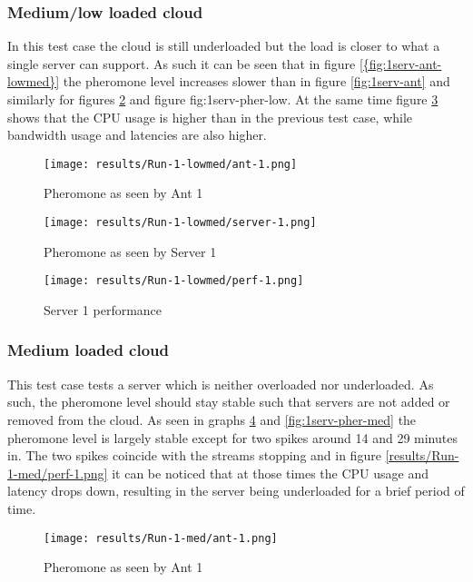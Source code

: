 \subsubsection{Medium/low loaded cloud}

In this test case the cloud is still underloaded but the load is closer to what a single server can support. As such it can be seen that in figure \ref{{fig:1serv-ant-lowmed}} the pheromone level increases slower than in figure \ref{fig:1serv-ant} and similarly for figures \ref{fig:1serv-pher-lowmed} and figure {fig:1serv-pher-low}. At the same time figure  \ref{fig:1serv-perf-lowmed} shows that the CPU usage is higher than in the previous test case, while bandwidth usage and latencies are also higher.

\begin{figure}
	\centering
		\texttt{[image: results/Run-1-lowmed/ant-1.png]}
	\caption{Pheromone as seen by Ant 1}
	\label{fig:1serv-ant-lowmed}
\end{figure}

\begin{figure}
	\centering
		\texttt{[image: results/Run-1-lowmed/server-1.png]}
	\caption{Pheromone as seen by Server 1}
	\label{fig:1serv-pher-lowmed}
\end{figure}

\begin{figure}
	\centering
		\texttt{[image: results/Run-1-lowmed/perf-1.png]}
	\caption{Server 1 performance}
	\label{fig:1serv-perf-lowmed}
\end{figure}

\subsubsection{Medium loaded cloud}

This test case tests a server which is neither overloaded nor underloaded. As such, the pheromone level should stay stable such that servers are not added or removed from the cloud. As seen in graphs \ref{fig:1serv-ant-med} and \ref{fig:1serv-pher-med} the pheromone level is largely stable except for two spikes around 14 and 29 minutes in. The two spikes coincide with the streams stopping and in figure \ref{results/Run-1-med/perf-1.png} it can be noticed that at those times the CPU usage and latency drops down, resulting in the server being underloaded for a brief period of time.

\begin{figure}
	\centering
		\texttt{[image: results/Run-1-med/ant-1.png]}
	\caption{Pheromone as seen by Ant 1}
	\label{fig:1serv-ant-med}
\end{figure}

